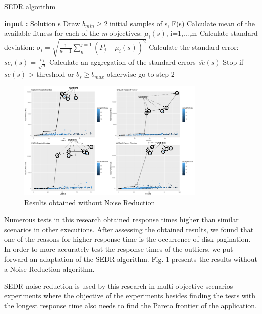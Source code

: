 \documentclass[espaco=umemeio,chapter=TITLE,twoside,openright]{abnt}
\begin{document}
\begin{algorithm}[h]
  \caption{SEDR algorithm \cite{Siegmund2013}}\label{SEDR}
  \begin{algorithmic}[1]

    \State \textbf{input :} Solution s
    \State Draw $b_{min}\ge 2$ initial samples of s, F(s)
    \State Calculate mean of the available fitness for each of the \textit{m} objectives: $\mu_{i}(s)$, i=1,...,m
    \State Calculate standard deviation: $\sigma_{i}=\sqrt{ \frac{1}{n-1} \sum_{n}^{j=1} (F^i_{j}-\mu_{i}(s))^2} $
    \State Calculate the standard error: $se_{i}(s)=\frac{\sigma_{i}}{\sqrt{n}}$
    \State Calculate an aggregation of the standard errors $\overline{se}(s)$
    \State Stop if  $\overline{se}(s)$ > threshold or $b_{s}\ge b_{max}$ otherwise go to step 2
  \end{algorithmic}
\end{algorithm}



\begin{figure}[!h]
\centering
\includegraphics[width=0.8\textwidth]{./images/outliers.png}
\caption{Results obtained without Noise Reduction}
\label{fig:outliers}
\end{figure}




Numerous tests in this research obtained response times higher than similar scenarios in other executions. After assessing the obtained results, we found that one of the reasons for higher response time is the occurrence of disk pagination. In order to more accurately test the response times of the outliers, we put forward an adaptation of the SEDR algorithm. Fig. \ref{fig:outliers} presents the results without a Noise Reduction algorithm.  

SEDR noise reduction is used by this research in multi-objective scenarios experiments where the objective of the experiments besides finding the tests with the longest response time also needs to find the Pareto frontier of the application. 
\end{document}

